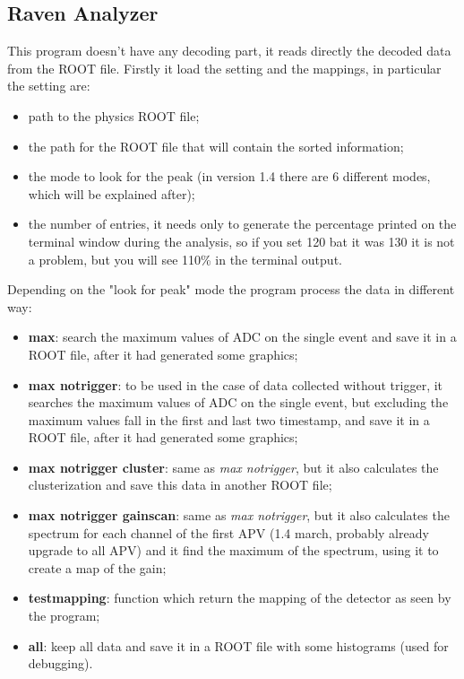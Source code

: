 \documentclass[a4paper,12pt]{article}
\begin{document}
	 	\subsection{Raven Analyzer}
 			This program doesn't have any decoding part, it reads directly the decoded data from the ROOT file.
 			Firstly it load the setting and the mappings, in particular the setting are:
 			\begin{itemize}
 				\item path to the physics ROOT file;
 				\item the path for the ROOT file that will contain the sorted information;
 				\item the mode to look for the peak (in version 1.4 there are 6 different modes, which will be explained after);
 				\item the number of entries, it needs only to generate the	percentage printed on the terminal window during the analysis, so if you set 120 bat it was 130 it is not a problem, but you will see 110\% in the terminal output.
 			\end{itemize}
 			Depending on the "look for peak" mode the program process the data in different way:
 			\begin{itemize}
 				\item \textbf{max}: search the maximum values of ADC on the single event and save it in a ROOT file, after it had generated some graphics;
 				\item \textbf{max notrigger}: to be used in the case of data collected without trigger, it searches the maximum values of ADC on the single event, but excluding the maximum values fall in the first and last two timestamp, and save it in a ROOT file, after it had generated some graphics;
 				\item \textbf{max notrigger cluster}: same as \textit{max notrigger}, but it also calculates the clusterization and save this data in another ROOT file;
 				\item \textbf{max notrigger gainscan}: same as \textit{max notrigger}, but it also calculates the spectrum for each channel of the first APV (1.4 march, probably already upgrade to all APV) and it find the maximum of the spectrum, using it to create a map of the gain;
 				\item \textbf{testmapping}: function which return the mapping of the detector as seen by the program;
 				\item \textbf{all}: keep all data and save it in a ROOT file with some histograms (used for debugging).
 			\end{itemize}
\end{document}
